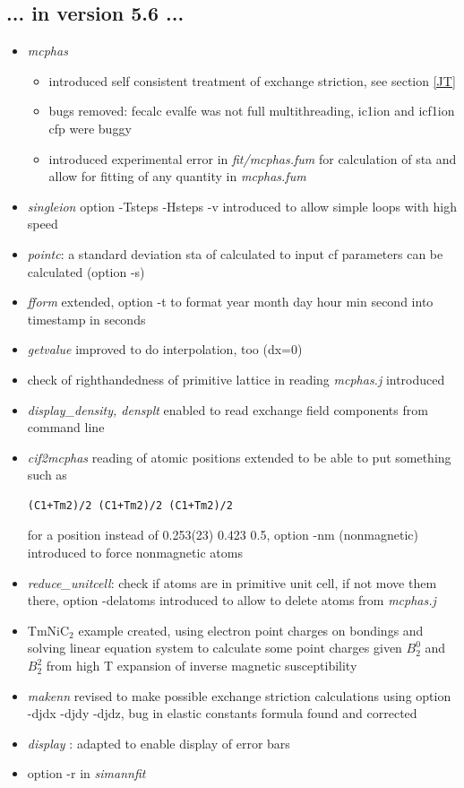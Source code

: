 \documentclass[twoside]{article}
\newcommand{\prg}{\sl}
\begin{document}
\subsection*{ ... in version 5.6 ...}
\begin{itemize}
\item {\prg mcphas}
\begin{itemize}\item introduced self consistent treatment of exchange striction, see section \ref{JT}
 \item bugs removed: fecalc evalfe was not full multithreading, ic1ion and icf1ion cfp were buggy
 \item introduced experimental error in {\prg fit/mcphas.fum} for calculation of sta
            and allow for fitting of any quantity in {\prg mcphas.fum}
\end{itemize}
\item {\prg singleion} option -Tsteps -Hsteps -v introduced to allow simple loops with high speed 
\item {\prg pointc}: a standard deviation sta of calculated  to input cf parameters can be calculated (option -s)
\item {\prg fform} extended, option -t to format year month day hour min second into timestamp in seconds
\item {\prg getvalue} improved to do interpolation, too (dx=0)
\item  check of righthandedness of primitive lattice in reading {\prg mcphas.j} introduced
\item {\prg display\_density, densplt} enabled to read exchange field components from command line
\item {\prg cif2mcphas} reading of atomic positions extended to be able to put something such as
         \begin{verbatim}(C1+Tm2)/2 (C1+Tm2)/2 (C1+Tm2)/2\end{verbatim} for a position instead of 0.253(23) 0.423  0.5, 
option -nm (nonmagnetic) introduced to force nonmagnetic atoms
\item {\prg reduce\_unitcell}: check if atoms are in primitive unit cell, if not
         move them there, option -delatoms introduced to allow to delete atoms from {\prg mcphas.j}
\item TmNiC$_2$ example created, using electron point charges on bondings
         and solving linear equation system to calculate some point charges
         given $B_2^0$ and $B_2^2$ from high T expansion of inverse magnetic susceptibility
\item {\prg makenn} 
revised to make possible exchange striction calculations using option -djdx -djdy -djdz,
bug in elastic constants formula found and corrected 
\item           {\prg  display }: adapted to enable display of error bars 
\item            option -r in {\prg simannfit}
\end{itemize}
\end{document}
